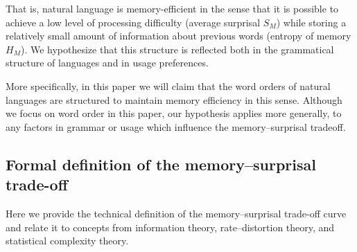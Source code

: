 That is, natural language is memory-efficient in the sense that it is possible to achieve a low level of processing difficulty (average surprisal $S_M$) while storing a relatively small amount of information about previous words (entropy of memory $H_M$). We hypothesize that this structure is reflected both in the grammatical structure of languages and in usage preferences.

More specifically, in this paper we will claim that the word orders of natural languages are structured to maintain memory efficiency in this sense. Although we focus on word order in this paper, our hypothesis applies more generally, to any factors in grammar or usage which influence the memory--surprisal tradeoff.

\subsection{Formal definition of the memory--surprisal trade-off}

Here we provide the technical definition of the memory--surprisal trade-off curve and relate it to concepts from information theory, rate--distortion theory, and statistical complexity theory. 


